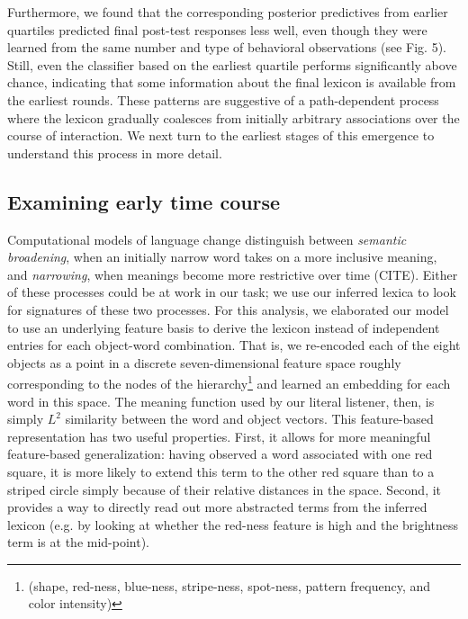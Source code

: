 \documentclass[10pt,letterpaper]{article}
\begin{document}
Furthermore, we found that the corresponding posterior predictives from earlier quartiles predicted final post-test responses less well, even though they were learned from the same number and type of behavioral observations (see Fig. 5). Still, even the classifier based on the earliest quartile performs significantly above chance, indicating that some information about the final lexicon is available from the earliest rounds. These patterns are suggestive of a path-dependent process where the lexicon gradually coalesces from initially arbitrary associations over the course of interaction. We next turn to the earliest stages of this emergence to understand this process in more detail.

\subsection{Examining early time course}

Computational models of language change distinguish between \emph{semantic broadening}, when an initially narrow word takes on a more inclusive meaning, and \emph{narrowing}, when meanings become more restrictive over time (CITE). Either of these processes could be at work in our task; we use our inferred lexica to look for signatures of these two processes. %
For this analysis, we elaborated our model to use an underlying feature basis to derive the lexicon instead of independent entries for each object-word combination. That is, we re-encoded each of the eight objects as a point in a discrete seven-dimensional feature space roughly corresponding to the nodes of the hierarchy\footnote{(shape, red-ness, blue-ness, stripe-ness, spot-ness, pattern frequency, and color intensity)} and learned an embedding for each word in this space. The meaning function used by our literal listener, then, is simply $L^2$ similarity between the word and object vectors. This feature-based representation has two useful properties. First, it allows for more meaningful feature-based generalization: having observed a word associated with one red square, it is more likely to extend this term to the other red square than to a striped circle simply because of their relative distances in the space. Second, it provides a way to directly read out more abstracted terms from the inferred lexicon (e.g. by looking at whether the red-ness feature is high and the brightness term is at the mid-point). 
\end{document}
